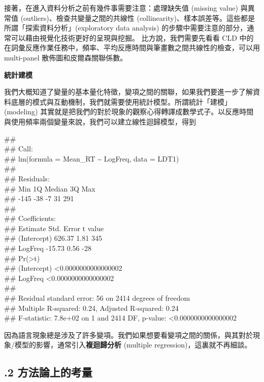 接著，在進入資料分析之前有幾件事需要注意：處理缺失值 (missing value) 與異常值 (outliers)、檢查共變量之間的共線性 (collinearity)、樣本誤差等。這些都是所謂「探索資料分析」(exploratory data analysis) 的步驟中需要注意的部分，通常可以藉由視覺化技術更好的呈現與挖掘。 比方說，我們需要先看看 CLD 中的在詞彙反應作業任務中，頻率、平均反應時間與筆畫數之間共線性的檢查，可以用 multi-panel 散佈圖和皮爾森關聯係數。

\textbf{統計建模}

我們大概知道了變量的基本量化特徵，變項之間的關聯，如果我們要進一步了解資料底層的模式與互動機制，我們就需要使用統計模型。所謂統計「建模」(modeling) 其實就是把我們的對於現象的觀察心得轉譯成數學式子。以反應時間與使用頻率兩個變量來說，我們可以建立線性迴歸模型，得到

\#\# \\
\#\# Call:\\
\#\# lm(formula = Mean\_RT {\textasciitilde} LogFreq, data = LDT1)\\
\#\# \\
\#\# Residuals:\\
\#\#    Min     1Q Median     3Q    Max \\
\#\#   {}-145    {}-38     {}-7     31    291 \\
\#\# \\
\#\# Coefficients:\\
\#\#             Estimate Std. Error t value\\
\#\# (Intercept)   626.37       1.81     345\\
\#\# LogFreq       {}-15.73       0.56     {}-28\\
\#\#                        Pr(>{\textbar}t{\textbar})\\
\#\# (Intercept) <0.0000000000000002\\
\#\# LogFreq     <0.0000000000000002\\
\#\# \\
\#\# Residual standard error: 56 on 2414 degrees of freedom\\
\#\# Multiple R-squared:  0.24,   Adjusted R-squared:  0.24 \\
\#\# F-statistic: 7.8e+02 on 1 and 2414 DF,  p-value: <0.0000000000000002

因為語言現象總是涉及了許多變項。我們如果想要看變項之間的關係，與其對於現象/模型的影響，通常引入\textbf{複迴歸分析} (multiple regression)，這裏就不再細談。

\subsection{.2 方法論上的考量}

